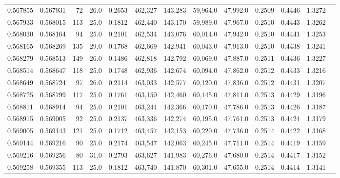 \begin{tabular}{rrrrrrrrrrrrr}
0.567855 & 0.567931 &    72 & 26.0 &                                     0.2653 & 462,327 & 143,283 &  59,964.0 &  47,992.0 & 0.2509 & 0.4446 & 1.3272 \\
0.567933 & 0.568015 &   113 & 25.0 &                                     0.1812 & 462,440 & 143,170 &  59,989.0 &  47,967.0 & 0.2510 & 0.4443 & 1.3262 \\
0.568030 & 0.568164 &    94 & 25.0 &                                     0.2101 & 462,534 & 143,076 &  60,014.0 &  47,942.0 & 0.2510 & 0.4441 & 1.3253 \\
0.568165 & 0.568269 &   135 & 29.0 &                                     0.1768 & 462,669 & 142,941 &  60,043.0 &  47,913.0 & 0.2510 & 0.4438 & 1.3241 \\
0.568279 & 0.568513 &   149 & 26.0 &                                     0.1486 & 462,818 & 142,792 &  60,069.0 &  47,887.0 & 0.2511 & 0.4436 & 1.3227 \\
0.568514 & 0.568647 &   118 & 25.0 &                                     0.1748 & 462,936 & 142,674 &  60,094.0 &  47,862.0 & 0.2512 & 0.4433 & 1.3216 \\
0.568649 & 0.568724 &    97 & 26.0 &                                     0.2114 & 463,033 & 142,577 &  60,120.0 &  47,836.0 & 0.2512 & 0.4431 & 1.3207 \\
0.568725 & 0.568799 &   117 & 25.0 &                                     0.1761 & 463,150 & 142,460 &  60,145.0 &  47,811.0 & 0.2513 & 0.4429 & 1.3196 \\
0.568811 & 0.568914 &    94 & 25.0 &                                     0.2101 & 463,244 & 142,366 &  60,170.0 &  47,786.0 & 0.2513 & 0.4426 & 1.3187 \\
0.568915 & 0.569005 &    92 & 25.0 &                                     0.2137 & 463,336 & 142,274 &  60,195.0 &  47,761.0 & 0.2513 & 0.4424 & 1.3179 \\
0.569005 & 0.569143 &   121 & 25.0 &                                     0.1712 & 463,457 & 142,153 &  60,220.0 &  47,736.0 & 0.2514 & 0.4422 & 1.3168 \\
0.569144 & 0.569216 &    90 & 25.0 &                                     0.2174 & 463,547 & 142,063 &  60,245.0 &  47,711.0 & 0.2514 & 0.4419 & 1.3159 \\
0.569216 & 0.569256 &    80 & 31.0 &                                     0.2793 & 463,627 & 141,983 &  60,276.0 &  47,680.0 & 0.2514 & 0.4417 & 1.3152 \\
0.569258 & 0.569355 &   113 & 25.0 &                                     0.1812 & 463,740 & 141,870 &  60,301.0 &  47,655.0 & 0.2514 & 0.4414 & 1.3141 \\

\end{tabular}
